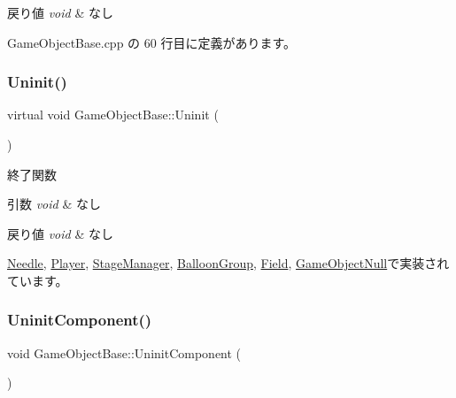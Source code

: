 \begin{DoxyRetVals}{戻り値}
{\em void} & なし \\
\hline
\end{DoxyRetVals}


 Game\+Object\+Base.\+cpp の 60 行目に定義があります。

\mbox{\label{class_game_object_base_a804828a399b4f76bb8c8a8d6727ebd97}} 
\subsubsection{\texorpdfstring{Uninit()}{Uninit()}}
{\footnotesize\ttfamily virtual void Game\+Object\+Base\+::\+Uninit (\begin{DoxyParamCaption}{ }\end{DoxyParamCaption})\hspace{0.3cm}{\ttfamily [pure virtual]}}



終了関数 


\begin{DoxyParams}{引数}
{\em void} & なし \\
\hline
\end{DoxyParams}

\begin{DoxyRetVals}{戻り値}
{\em void} & なし \\
\hline
\end{DoxyRetVals}


\mbox{\hyperlink{class_needle_a077c40beda665b249522349df0f16da1}{Needle}}, \mbox{\hyperlink{class_player_a7455a83ac23d2f5e0cce0ddd7d92db0c}{Player}}, \mbox{\hyperlink{class_stage_manager_ab36f48dee34ce481c585b1d96df26dce}{Stage\+Manager}}, \mbox{\hyperlink{class_balloon_group_a12ade72ec1cbb2a1afe431c471bbc255}{Balloon\+Group}}, \mbox{\hyperlink{class_field_a6d1015e2409daa87cd00485ac1efc06b}{Field}}, \mbox{\hyperlink{class_game_object_null_a1a70fbd3260fd1c0100320756830a0db}{Game\+Object\+Null}}で実装されています。

\mbox{\label{class_game_object_base_aff8e4f486435f5d921c186b0824e8a0e}} 
\subsubsection{\texorpdfstring{Uninit\+Component()}{UninitComponent()}}
{\footnotesize\ttfamily void Game\+Object\+Base\+::\+Uninit\+Component (\begin{DoxyParamCaption}{ }\end{DoxyParamCaption})\hspace{0.3cm}{\ttfamily [protected]}}



